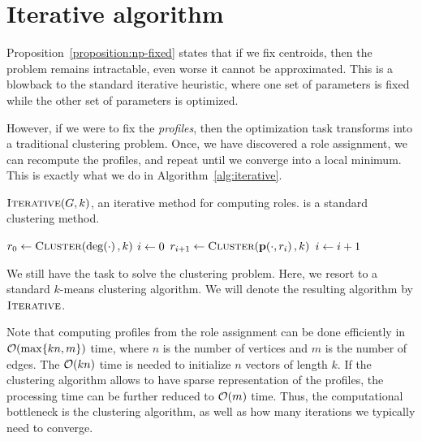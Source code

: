 \section{Iterative algorithm}
\label{sec:kmeans}

Proposition~\ref{proposition:np-fixed} states that if we fix centroids, then
the problem remains intractable, even worse it cannot be approximated. This is
a blowback to the standard iterative heuristic, where one set of parameters is
fixed while the other set of parameters is optimized.

However, if we were to fix the \emph{profiles}, then the optimization task
transforms into a traditional clustering problem. Once, we have discovered a
role assignment, we can recompute the profiles, and repeat until we converge
into a local minimum. This is exactly what we do in Algorithm~\ref{alg:iterative}.

\begin{algorithm}
\caption{$\textsc{Iterative}(G, k)$, an iterative method for computing roles.
\algcluster is a standard clustering method.}
\label{alg:iterative}
$r_0 \define \algcluster(\dg{\cdot}, k)$ \;
$i \leftarrow 0$\;
 {
	$r_{i + 1} \define \algcluster(\prof{\cdot, r_i}, k)$ \;
	$i \leftarrow i + 1$\;
}
\end{algorithm}

We still have the task to solve the clustering problem. Here, we resort to a
standard $k$-means clustering algorithm. We will denote the resulting algorithm
by $\textsc{Iterative}$.

Note that computing profiles from the role assignment can be done efficiently
in $\bigO{\max\{kn, m\}}$ time, where $n$ is the number of vertices and $m$ is
the number of edges. The $\bigO{kn}$ time is needed to initialize $n$ vectors of length $k$.
If the clustering algorithm allows to have sparse representation
of the profiles, the processing time can be further reduced to $\bigO{m}$ time.
Thus, the computational bottleneck is the clustering algorithm, as
well as how many iterations we typically need to converge.
